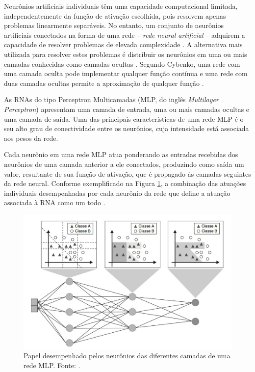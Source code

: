 
Neurônios artificiais individuais têm uma capacidade computacional limitada, independentemente da função de ativação escolhida, pois resolvem apenas problemas linearmente separáveis. No entanto, um conjunto de neurônios artificiais conectados na forma de uma rede -- \emph{rede neural artificial} -- adquirem a capacidade de resolver problemas de elevada complexidade \cite{ref:teresa}. A alternativa mais utilizada para resolver estes problemas é distribuir os neurônios em uma ou mais camadas conhecidas como  camadas ocultas \cite{ref:faceli}. Segundo Cybenko, uma rede com uma camada oculta pode implementar qualquer função contínua e uma rede com duas camadas ocultas permite a aproximação de qualquer função \cite{ref:cybenko}.


As RNAs do tipo Perceptron Multicamadas (MLP, do inglês \emph{Multilayer Perceptron}) apresentam uma camada de entrada, uma ou mais camadas ocultas e uma camada de saída. Uma das principais características de uma rede MLP é o seu alto grau de conectividade entre os neurônios, cuja intensidade está associada aos pesos da rede.

Cada neurônio em uma rede MLP atua ponderando as entradas recebidas dos neurônios de uma camada anterior a ele conectados, produzindo como saída um valor, resultante de sua função de ativação, que é propagado às camadas seguintes da rede neural. Conforme exemplificado na Figura \ref{img:rede-mlp}, a combinação das atuações individuais desempenhadas por cada neurônio da rede que define a atuação associada à RNA como um todo \cite{ref:teresa,ref:faceli,ref:haykin}.


\begin{figure}[h!]
	\centering
	\includegraphics[width=1\textwidth]{./img/rede-mlp}
	\caption{Papel desempenhado pelos neurônios das diferentes camadas de uma rede MLP. Fonte: \cite{ref:faceli}.}
	\label{img:rede-mlp}
\end{figure}

